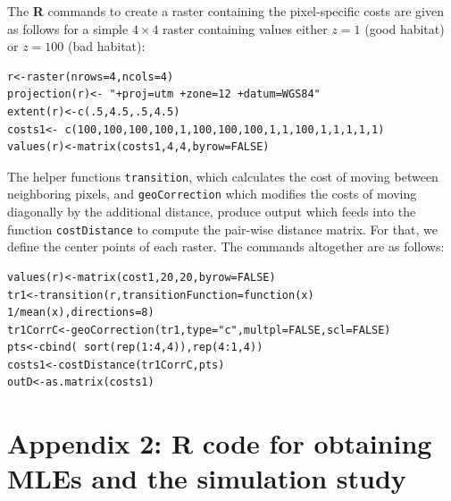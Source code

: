 \documentclass[12pt]{article}
\begin{document}
The {\bf R} commands to create a raster containing the pixel-specific
costs are given as follows for a simple $4\times 4$ raster containing
values either $z=1$ (good habitat) or $z=100$ (bad habitat):
\begin{verbatim}
r<-raster(nrows=4,ncols=4)
projection(r)<- "+proj=utm +zone=12 +datum=WGS84"
extent(r)<-c(.5,4.5,.5,4.5)
costs1<- c(100,100,100,100,1,100,100,100,1,1,100,1,1,1,1,1)
values(r)<-matrix(costs1,4,4,byrow=FALSE)
\end{verbatim}
The helper functions \mbox{\tt transition}, which
calculates the cost of moving between neighboring pixels, and
\mbox{\tt geoCorrection} which modifies the costs of moving diagonally
by the additional distance, produce output which feeds into the
function \mbox{\tt costDistance} to compute the pair-wise distance
matrix. For that, we define the center points of each raster.  The
commands altogether are as follows:

\begin{verbatim}
values(r)<-matrix(cost1,20,20,byrow=FALSE)
tr1<-transition(r,transitionFunction=function(x) 1/mean(x),directions=8)
tr1CorrC<-geoCorrection(tr1,type="c",multpl=FALSE,scl=FALSE)
pts<-cbind( sort(rep(1:4,4)),rep(4:1,4))
costs1<-costDistance(tr1CorrC,pts)
outD<-as.matrix(costs1)
\end{verbatim}



\section*{Appendix 2: {\bf R} code for obtaining MLEs and the
  simulation study}
\end{document}
